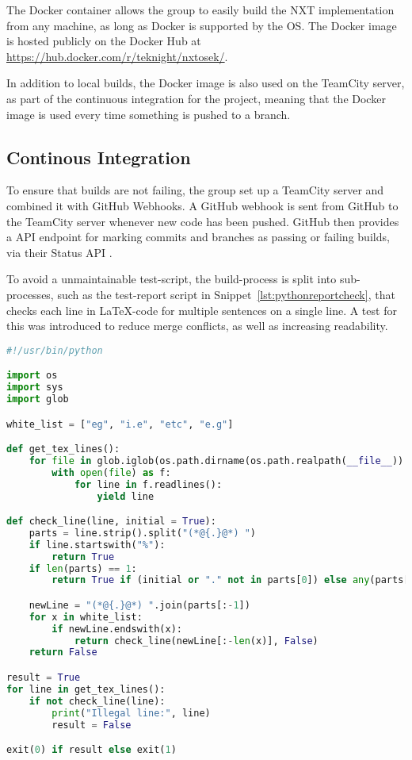 The Docker container allows the group to easily build the NXT implementation from any machine, as long as Docker is supported by the OS.
The Docker image is hosted publicly on the Docker Hub at \url{https://hub.docker.com/r/teknight/nxtosek/}.

In addition to local builds, the Docker image is also used on the TeamCity server, as part of the continuous integration for the project, meaning that the Docker image is used every time something is pushed to a branch.

\subsection{Continous Integration}
To ensure that builds are not failing, the group set up a TeamCity server\cite{TeamCityHomepage} and combined it with GitHub Webhooks.
A GitHub webhook is sent from GitHub to the TeamCity server whenever new code has been pushed.
GitHub then provides a API endpoint for marking commits and branches as passing or failing builds, via their Status API \cite{GithubStatusAPI}.


To avoid a unmaintainable test-script, the build-process is split into sub-processes, such as the test-report script in Snippet~\ref{lst:pythonreportcheck}, that checks each line in \LaTeX{}-code for multiple sentences on a single line.
A test for this was introduced to reduce merge conflicts, as well as increasing readability.

\begin{lstlisting}[language=python,label={lst:pythonreportcheck},caption={Checking .tex files}]
#!/usr/bin/python

import os
import sys
import glob

white_list = ["eg", "i.e", "etc", "e.g"]

def get_tex_lines():
    for file in glob.iglob(os.path.dirname(os.path.realpath(__file__)) + '/report/*/**/*.tex', recursive=True):
        with open(file) as f:
            for line in f.readlines():
                yield line

def check_line(line, initial = True):
    parts = line.strip().split("(*@{.}@*) ")
    if line.startswith("%"):
        return True
    if len(parts) == 1:
        return True if (initial or "." not in parts[0]) else any(parts[0][:-1].endswith(x) for x in white_list)

    newLine = "(*@{.}@*) ".join(parts[:-1])
    for x in white_list:
        if newLine.endswith(x):
            return check_line(newLine[:-len(x)], False)
    return False

result = True
for line in get_tex_lines():
    if not check_line(line):
        print("Illegal line:", line)
        result = False

exit(0) if result else exit(1)
\end{lstlisting}

